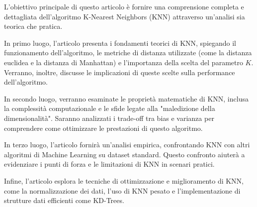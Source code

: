 L'obiettivo principale di questo articolo è fornire una comprensione completa e dettagliata 
dell'algoritmo K-Nearest Neighbors (KNN) attraverso un'analisi sia teorica che pratica.

In primo luogo, l'articolo presenta i fondamenti teorici di KNN, spiegando il funzionamento 
dell'algoritmo, le metriche di distanza utilizzate (come la distanza euclidea e la distanza di Manhattan) 
e l'importanza della scelta del parametro $K$. Verranno, inoltre, discusse le implicazioni di queste scelte 
sulla performance dell'algoritmo.

In secondo luogo, verranno esaminate le proprietà matematiche di KNN, inclusa la complessità 
computazionale e le sfide legate alla "maledizione della dimensionalità". Saranno analizzati i 
trade-off tra bias e varianza per comprendere come ottimizzare le prestazioni di questo algoritmo.

In terzo luogo, l'articolo fornirà un'analisi empirica, confrontando KNN con altri algoritmi 
di Machine Learning su dataset standard. Questo confronto aiuterà a evidenziare i punti di forza 
e le limitazioni di KNN in scenari pratici.

Infine, l'articolo esplora le tecniche di ottimizzazione e miglioramento di KNN, 
come la normalizzazione dei dati, l'uso di KNN pesato e l'implementazione di strutture 
dati efficienti come KD-Trees.